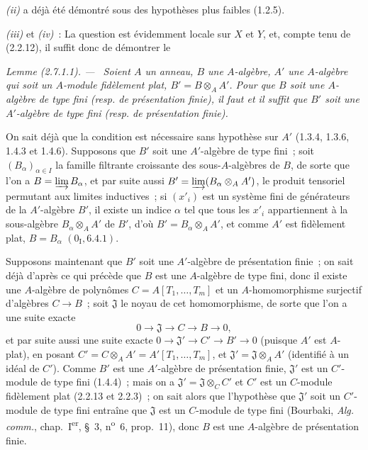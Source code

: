 \documentclass[10pt,oneside]{book}
\newenvironment{lemma}[1][]{%
  \par\medskip\noindent\itshape Lemme (#1). ---\ }{\par}
\begin{document}
\emph{(ii)} a déjà été démontré sous des hypothèses plus faibles (1.2.5).

\emph{(iii)} et \emph{(iv)}~: La question est évidemment locale sur $X$ et
$Y$, et, compte tenu de (2.2.12), il suffit donc de démontrer le

\begin{lemma}[2.7.1.1]
\label{IV.2.7.1.1-fr}
Soient $A$ un anneau, $B$ une $A$-algèbre, $A'$ une $A$-algèbre qui soit un
$A$-module fidèlement plat, $B'=B\otimes_A A'$. Pour que $B$ soit une
$A$-algèbre de type fini (resp. de présentation finie), il faut et il suffit
que $B'$ soit une $A'$-algèbre de type fini (resp. de présentation finie).
\end{lemma}

On sait déjà que la condition est nécessaire sans hypothèse sur $A'$
(1.3.4, 1.3.6, 1.4.3 et 1.4.6). Supposons que $B'$ soit une $A'$-algèbre de
type fini~; soit $(B_\alpha)_{\alpha\in I}$ la famille filtrante croissante
des sous-$A$-algèbres de $B$, de sorte que l'on a
$B=\varinjlim B_\alpha$, et par suite aussi
$B'=\varinjlim(B_\alpha\otimes_A A')$, le produit tensoriel permutant aux
limites inductives~; si $(x'_i)$ est un système fini de générateurs de la
$A'$-algèbre $B'$, il existe un indice $\alpha$ tel que tous les $x'_i$
appartiennent à la sous-algèbre $B_\alpha\otimes_A A'$ de $B'$, d'où
$B'=B_\alpha\otimes_A A'$, et comme $A'$ est fidèlement plat,
$B=B_\alpha$ $(0_{\mathrm I},6.4.1)$.

Supposons maintenant que $B'$ soit une $A'$-algèbre de présentation finie~;
on sait déjà d'après ce qui précède que $B$ est une $A$-algèbre de type fini,
donc il existe une $A$-algèbre de polynômes
$C=A[T_1,\ldots,T_m]$ et un $A$-homomorphisme surjectif d'algèbres
$C\to B$~; soit $\mathfrak J$ le noyau de cet homomorphisme, de sorte que
l'on a une suite exacte
\[
0\to\mathfrak J\to C\to B\to0,
\]
et par suite aussi une suite exacte $0\to\mathfrak J'\to C'\to B'\to0$
(puisque $A'$ est $A$-plat), en posant
$C'=C\otimes_A A'=A'[T_1,\ldots,T_m]$, et
$\mathfrak J'=\mathfrak J\otimes_A A'$ (identifié à un idéal de $C'$).
Comme $B'$ est une $A'$-algèbre de présentation finie, $\mathfrak J'$ est un
$C'$-module de type fini (1.4.4)~; mais on a
$\mathfrak J'=\mathfrak J\otimes_C C'$ et $C'$ est un $C$-module fidèlement
plat (2.2.13 et 2.2.3)~; on sait alors que l'hypothèse que $\mathfrak J'$ soit
un $C'$-module de type fini entraîne que $\mathfrak J$ est un $C$-module de
type fini (Bourbaki, \emph{Alg. comm.}, chap.~I\textsuperscript{er}, \S~3,
n\textsuperscript{o}~6, prop.~11), donc $B$ est une $A$-algèbre de
présentation finie.
\end{document}
